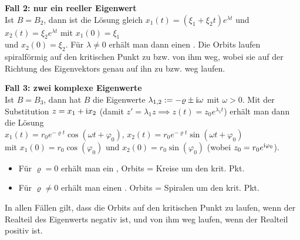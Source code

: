 \textbf{Fall 2: nur ein reeller Eigenwert}\\
Ist $B = B_2$, dann ist die Lösung gleich $x_1(t) = (\xi_1 + \xi_2 t) e^{\lambda t}$ und
$x_2(t) = \xi_2 e^{\lambda t}$ mit $x_1(0) = \xi_1$\\
und $x_2(0) = \xi_2$.
Für $\lambda \not= 0$ erhält man dann einen
.
Die Orbits laufen spiralförmig auf den kritischen Punkt zu bzw. von ihm weg,
wobei sie auf der Richtung des Eigenvektors genau auf ihn zu bzw. weg laufen.

\textbf{Fall 3: zwei komplexe Eigenwerte}\\
Ist $B = B_3$, dann hat $B$ die Eigenwerte $\lambda_{1,2} := -\varrho \pm \text{i}\omega$
mit $\omega > 0$.
Mit der Substitution $z = x_1 + \text{i} x_2$
(damit $z' = \lambda_1 z \implies z(t) = z_0 e^{\lambda_1 t}$) erhält man dann die Lösung\\
$x_1(t) = r_0 e^{-\varrho t} \cos(\omega t + \varphi_0)$,
$x_2(t) = r_0 e^{-\varrho t} \sin(\omega t + \varphi_0)$\\
mit $x_1(0) = r_0 \cos(\varphi_0)$ und
$x_2(0) = r_0 \sin(\varphi_0)$ (wobei $z_0 = r_0 e^{\text{i}\varphi_0}$).
\begin{itemize}
    \item
    Für $\varrho = 0$ erhält man ein ,
    Orbits = Kreise um den krit. Pkt.
    
    \item
    Für $\varrho \not= 0$ erhält man einen .
    Orbits = Spiralen um den krit. Pkt.
\end{itemize}

In allen Fällen gilt, dass die Orbits auf den kritischen Punkt zu laufen,
wenn der Realteil des Eigenwerts negativ ist, und von ihm weg laufen,
wenn der Realteil positiv ist.

\linie

